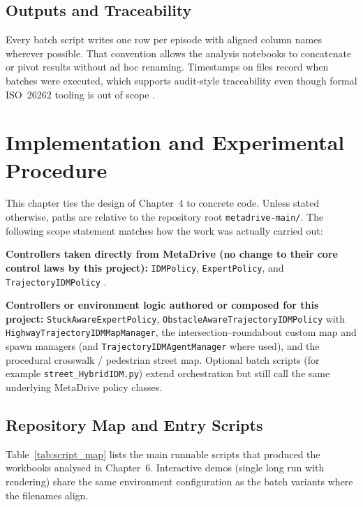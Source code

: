 \documentclass[12pt,a4paper]{report}
\begin{document}
\section{Outputs and Traceability}
Every batch script writes one row per episode with aligned column names wherever possible. That convention allows the analysis notebooks to concatenate or pivot results without ad hoc renaming. Timestamps on files record when batches were executed, which supports audit-style traceability even though formal ISO~26262 tooling is out of scope \cite{iso26262}.

\chapter{Implementation and Experimental Procedure}

This chapter ties the design of Chapter~4 to concrete code. Unless stated otherwise, paths are relative to the repository root \texttt{metadrive-main/}. The following scope statement matches how the work was actually carried out:

\textbf{Controllers taken directly from MetaDrive (no change to their core control laws by this project):} \texttt{IDMPolicy}, \texttt{ExpertPolicy}, and \texttt{TrajectoryIDMPolicy} \cite{metadrive,metadrive_docs}.

\textbf{Controllers or environment logic authored or composed for this project:} \texttt{StuckAwareExpertPolicy}, \texttt{ObstacleAwareTrajectoryIDMPolicy} with \texttt{HighwayTrajectoryIDMMapManager}, the intersection--roundabout custom map and spawn managers (and \texttt{TrajectoryIDMAgentManager} where used), and the procedural crosswalk / pedestrian street map. Optional batch scripts (for example \texttt{street\_HybridIDM.py}) extend orchestration but still call the same underlying MetaDrive policy classes.

\section{Repository Map and Entry Scripts}
Table~\ref{tab:script_map} lists the main runnable scripts that produced the workbooks analysed in Chapter~6. Interactive demos (single long run with rendering) share the same environment configuration as the batch variants where the filenames align.
\end{document}
